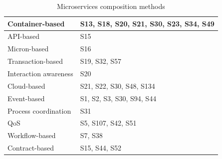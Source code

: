 \documentclass{article}
\begin{document}
\begin{multicols}{2}
\begin{table}[ht!]
\begin{center}
\begin{tabular}{ | m{20em} | m{20em} | }
Container-based                                                   & S13,   S18, S20, S21, S30, S23, S34, S49                                                                \\ \hline
API-based                                                         & S15                                                                                                     \\ \hline
Micron-based                                                      & S16                                                                                                     \\ \hline
Transaction-based                                                 & S19,   S32, S57                                                                                         \\ \hline
Interaction   awareness                                           & S20                                                                                                     \\ \hline
Cloud-based                                                       & S21,   S22, S30, S48, S134                                                                              \\ \hline
Event-based                                                       & S1,   S2, S3, S30, S94, S44                                                                             \\ \hline
Process   coordination                                            & S31                                                                                                     \\ \hline
QoS                                                               & S5,   S107, S42, S51                                                                                    \\ \hline
Workflow-based                                                    & S7,   S38                                                                                               \\ \hline
Contract-based                                                    & S15,   S44, S52                                                                                         \\ \hline
\end{tabular}
\end{center}
\caption{Microservices composition methods}
\label{table:1}
\end{table}


\end{multicols}
\end{document}
